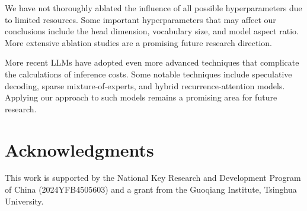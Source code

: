 \documentclass[11pt]{article}
\begin{document}
We have not thoroughly ablated the influence of all possible hyperparameters due to limited resources. Some important hyperparameters that may affect our conclusions include the head dimension, vocabulary size, and model aspect ratio. More extensive ablation studies are a promising future research direction.

More recent LLMs have adopted even more advanced techniques that complicate the calculations of inference costs. Some notable techniques include speculative decoding, sparse mixture-of-experts, and hybrid recurrence-attention models. Applying our approach to such models remains a promising area for future research.

\section*{Acknowledgments}

This work is supported by the National Key Research and Development Program of China (2024YFB4505603) and a grant from the Guoqiang Institute, Tsinghua University.


%
\newpage


\appendix



\end{document}
